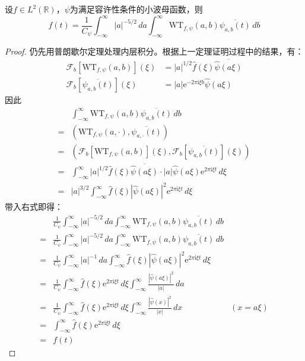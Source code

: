 \begin{theorem}[小波变换反演公式]
    设$f\in L^2(\mathbb{R})$，$\psi$为满足容许性条件的小波母函数，则
    \[f(t)=\frac{1}{C_{\psi}}\int_{-\infty}^{\infty}|a|^{-5/2}\,da\int_{-\infty}^{\infty}\mathrm{WT} _{f,\psi}(a,b)\overline{\psi_{a,b}(t)}\,db\]    
\end{theorem}
\begin{proof}
    仍先用普朗歇尔定理处理内层积分。根据上一定理证明过程中的结果，有：
    \begin{align*}
        \mathcal{F} _b[\mathrm{WT} _{f,\psi}(a,b)](\xi)&=|a|^{1/2}\hat{f}(\xi)\overline{\hat{\psi}(a\xi)}\\
        \mathcal{F} _b[\overline{\psi_{a,b}(t)}](\xi)&=|a|\mathrm{e}^{-2\pi \mathrm{i}\xi b}\hat{\psi}(a\xi)
    \end{align*}
    因此
    \begin{align*}
        &\int_{-\infty}^{\infty}\mathrm{WT} _{f,\psi}(a,b)\overline{\psi_{a,b}(t)}\,db\\
        =&\left( \mathrm{WT} _{f,\psi}(a,\cdot),\overline{\psi_{a,\cdot}(t)}\right)\\
        =&\left( \mathcal{F} _b[\mathrm{WT} _{f,\psi}(a,b)](\xi),\mathcal{F} _b[\overline{\psi_{a,b}(t)}](\xi)\right)\\
        =&\int_{-\infty}^{\infty}|a|^{1/2}\hat{f}(\xi)\overline{\hat{\psi}(a\xi)}\cdot |a| \hat{\psi}(a\xi)\mathrm{e}^{2\pi \mathrm{i}\xi t}\,d\xi\\
        =&|a|^{3/2}\int_{-\infty}^{\infty}\hat{f}(\xi)|\hat{\psi}(a\xi)|^2 \mathrm{e}^{2\pi \mathrm{i}\xi t}\,d\xi
    \end{align*}
    带入右式即得：
    \begin{align*}
        &\frac{1}{C_{\psi}}\int_{-\infty}^{\infty}|a|^{-5/2}\,da\int_{-\infty}^{\infty}\mathrm{WT} _{f,\psi}(a,b)\overline{\psi_{a,b}(t)}\,db\\
        =&\frac{1}{C_{\psi}}\int_{-\infty}^{\infty}|a|^{-5/2}\,da\int_{-\infty}^{\infty}\mathrm{WT} _{f,\psi}(a,b)\overline{\psi_{a,b}(t)}\,db\\
        =&\frac{1}{C_{\psi}}\int_{-\infty}^{\infty}|a|^{-1}\,da\int_{-\infty}^{\infty}\hat{f}(\xi)|\hat{\psi}(a\xi)|^2 \mathrm{e}^{2\pi \mathrm{i}\xi t}\,d\xi\\
        =&\frac{1}{C_{\psi}}\int_{-\infty}^{\infty}\hat{f}(\xi)\mathrm{e}^{2\pi \mathrm{i}\xi t}\,d\xi\int_{-\infty}^{\infty}\frac{|\hat{\psi}(a\xi)|^2}{|a|}\,da\\
        =&\frac{1}{C_{\psi}}\int_{-\infty}^{\infty}\hat{f}(\xi)\mathrm{e}^{2\pi \mathrm{i}\xi t}\,d\xi\int_{-\infty}^{\infty}\frac{|\hat{\psi}(x)|^2}{|x|}\,dx&(x=a\xi)\\
        =&\int_{-\infty}^{\infty}\hat{f}(\xi)\mathrm{e}^{2\pi \mathrm{i}\xi t}\,d\xi\\
        =&f(t)
    \end{align*}
\end{proof}

